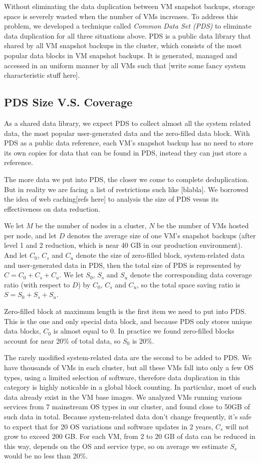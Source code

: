 Without eliminating the data duplication between VM snapshot backups, storage space is severely wasted when the number of VMs increases.
To address this problem, we developed a technique called \emph{Common Data Set (PDS)} to eliminate data duplication for all three situations above. 
PDS is a public data library that shared by all VM snapshot backups in the cluster, 
which consists of the most popular data blocks in VM snapshot backups. It is generated, 
managed and accessed in an uniform manner by all VMs such that [write some fancy system characteristic stuff here].

\subsection{PDS Size V.S. Coverage}
As a shared data library, we expect PDS to collect almost all the system related data, the most popular user-generated data and the zero-filled data block.
With PDS as a public data reference, each VM's snapshot backup has no need to store its own copies for data that can be found in PDS, instead they can just
store a reference.

The more data we put into PDS, the closer we come to complete deduplication. But in reality we are facing a list of restrictions such like [blabla].
We borrowed the idea of web caching[refs here] to analysis the size of PDS vesus its effectiveness on data reduction.

We let $M$ be the number of nodes in a cluster, $N$ be the number of VMs hosted per node,
and let $D$ denotes the average size of one VM's snapshot backups (after level 1 and 2 reduction, which is near 40 GB in our production environment).
And let $C_0$, $C_s$ and $C_u$ denote the size of zero-filled block, system-related data and user-generated data in PDS,
then the total size of PDS is represented by $C=C_0+C_s+C_u$.
We let $S_0$, $S_s$ and $S_u$ denote the corresponding data coverage ratio (with respect to $D$) by $C_0$, $C_s$ and $C_u$,
so the total space saving ratio is $S=S_0+S_s+S_u$.

Zero-filled block at maximum length is the first item we need to put into PDS. This is the one and only special data block, 
and because PDS only stores unique data blocks, $C_0$ is almost equal to 0. In practice we found zero-filled blocks account
for near 20\% of total data, so $S_0$ is 20\%.

The rarely modified system-related data are the second to be added to PDS. We have thousands of VMs in each cluster, 
but all these VMs fall into only a few OS types, using a limited selection of software, therefore data duplication in this category
is highly noticable in a global block counting. In particular, most of such data already exist in the VM base images. 
We analyzed VMs running various services from 7 mainstream OS types in our cluster, and found close to 50GB of such data in total. 
Because system-related data don't change frequently, it's safe to expect that for 20 OS variations 
and software updates in 2 years, $C_s$ will not grow to exceed 200 GB.
For each VM, from 2 to 20 GB of data can be reduced in this way, depends on the OS and service type, so on average we estimate
$S_s$ would be no less than 20\%.

